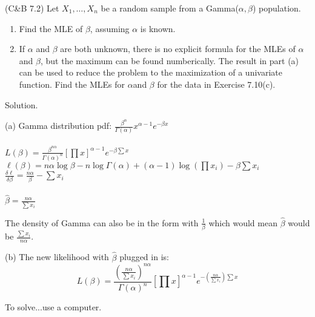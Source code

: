 \documentclass[11pt,fleqn]{book} %
\begin{document}
	\begin{problem} (C\&B 7.2) Let $X_1, \dots, X_n$ be a random sample from a Gamma($\alpha, \beta$) population.

		\begin{enumerate}[label=(\alph*)] 
			\item Find the MLE of $\beta$, assuming $\alpha$ is known.
			\item If $\alpha$ and $\beta$ are both unknown, there is no explicit formula for the MLEs of $\alpha$ and $\beta$, but the maximum can be found numberically. The result in part (a) can be used to reduce the problem to the maximization of a univariate function. Find the MLEs for $\alpha$and $\beta$ for the data in Exercise 7.10(c).
		\end{enumerate}

			Solution.

			(a) Gamma distribution pdf: $\frac{\beta^\alpha}{\Gamma(\alpha)}x^{\alpha-1}e^{-\beta x}$\\
			\\
			$L(\beta) = \frac{\beta^{n\alpha}}{\Gamma(\alpha)^n}[\prod x]^{\alpha-1}e^{-\beta \sum x}$\\

			$\ell(\beta) = n\alpha\log\beta - n\log\Gamma(\alpha) +(\alpha-1)\log(\prod x_i) - \beta \sum x_i $\\

			$\frac{\delta \ell}{\delta \beta} = \frac{n\alpha}{\beta} - \sum x_i$\\
			\\
			$\hat{\beta} = \frac{n\alpha}{\sum x_i}$

			\begin{remark}
				The density of Gamma can also be in the form with $\frac{1}{\beta}$ which would mean $\hat{\beta}$ would be $\frac{\sum x_i}{n\alpha} $.
			\end{remark} 

			(b) The new likelihood with $\hat{\beta}$ plugged in is:
			$$ L(\beta) = \frac{(\frac{n\alpha}{\sum x_i})^{n\alpha}}{\Gamma(\alpha)^n}[\prod x]^{\alpha-1}e^{-(\frac{n\alpha}{\sum x_i}) \sum x}$$ 

			To solve...use a computer.\\
			\\

	\end{problem}
	
\end{document}
